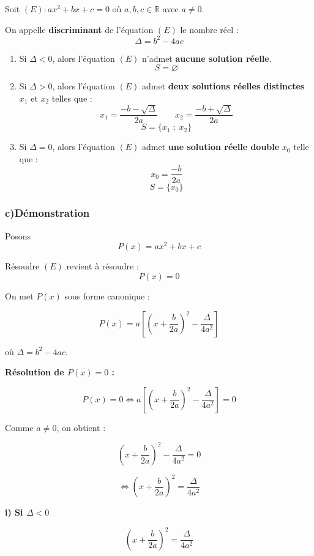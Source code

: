 \documentclass[12pt,a4paper]{article}
\newcounter{solution}
\begin{document}
Soit $(E) : ax^2 + bx + c = 0$ où $a,b,c \in \mathbb{R}$ avec $a \neq 0$.

On appelle \textbf{discriminant} de l'équation $(E)$ le nombre réel :
\[
\Delta = b^2 - 4ac
\]

\begin{enumerate}
    \item Si $\Delta < 0$, alors l'équation $(E)$ n'admet \textbf{aucune solution réelle}.  
    \[
    S = \varnothing
    \]

    \item Si $\Delta > 0$, alors l'équation $(E)$ admet \textbf{deux solutions réelles distinctes} $x_1$ et $x_2$ telles que :
    \[
    x_1 = \frac{-b - \sqrt{\Delta}}{2a}
    \qquad
    x_2 = \frac{-b + \sqrt{\Delta}}{2a}
    \]
    \[
    S = \{x_1 \; ; \; x_2\}
    \]

    \item Si $\Delta = 0$, alors l'équation $(E)$ admet \textbf{une solution réelle double} $x_0$ telle que :
    \[
    x_0 = \frac{-b}{2a}
    \]
    \[
    S = \{x_0\}
    \]
\end{enumerate}
\subsubsection*{c)\quad Démonstration}

Posons 
\[
P(x) = ax^2 + bx + c
\]

Résoudre $(E)$ revient à résoudre :
\[
P(x) = 0
\]

\medskip

On met $P(x)$ sous forme canonique :

\[
P(x) = a \left[ \left(x + \frac{b}{2a}\right)^2 - \frac{\Delta}{4a^2} \right]
\]

où $\Delta = b^2 - 4ac$.

\medskip

\textbf{Résolution de $P(x)=0$ :}

\[
P(x)=0 
\Longleftrightarrow 
a \left[ \left(x + \frac{b}{2a}\right)^2 - \frac{\Delta}{4a^2} \right] = 0
\]

Comme $a \neq 0$, on obtient :

\[
\left(x + \frac{b}{2a}\right)^2 - \frac{\Delta}{4a^2} = 0
\]

\[
\Longleftrightarrow
\left(x + \frac{b}{2a}\right)^2 = \frac{\Delta}{4a^2}
\]

\bigskip

\textbf{i) Si $\Delta < 0$}

\[
\left(x + \frac{b}{2a}\right)^2 = \frac{\Delta}{4a^2}
\]
\end{document}
